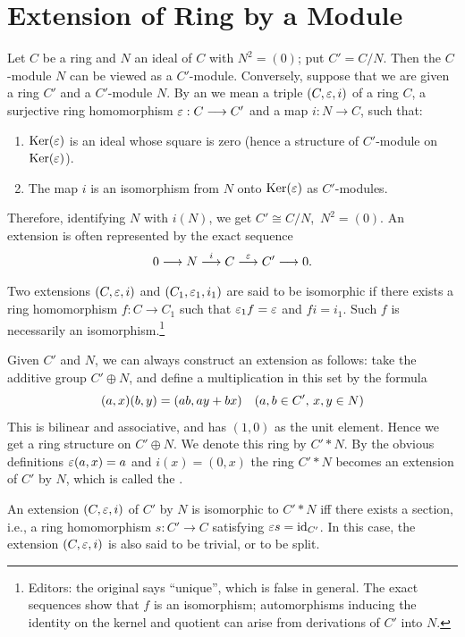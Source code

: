 \documentclass[../main]{subfiles}
\begin{document}
\section{Extension of Ring by a Module}\label{sec:25}

\newparagraph
Let $C$ be a ring and $N$ an ideal of $C$ with $N^2=(0)$; put $C'=C/N$. Then the $C$-module $N$ can be viewed as a $C'$-module. Conversely, suppose that we are given a ring $C'$ and a $C'$-module $N$. By an  we mean a triple $(C,\varepsilon,i)$ of a ring $C$, a surjective ring homomorphism $\varepsilon:C\longrightarrow C'$ and a map $i:N\longrightarrow C$, such that:
\begin{enumerate}
    \item $\operatorname{Ker}(\varepsilon)$ is an ideal whose square is zero (hence a structure of $C'$-module on $\operatorname{Ker}(\varepsilon)$).
    \item The map $i$ is an isomorphism from $N$ onto $\operatorname{Ker}(\varepsilon)$ as $C'$-modules.
\end{enumerate}
Therefore, identifying $N$ with $i(N)$, we get $C'\cong C/N$, $\, N^2=(0)$. An extension is often represented by the exact sequence \[0\longrightarrow N\varrightarrow iC\varrightarrow\ep C'\longrightarrow0.\] Two extensions $(C,\varepsilon,i)$ and $(C_1,\varepsilon_1,i_1)$ are said to be isomorphic if there exists a ring homomorphism $f:C\longrightarrow C_1$ such that $\varepsilon_1f=\varepsilon$ and $fi=i_1$. Such $f$ is necessarily an isomorphism.\footnote{Editors: the original says ``unique'', which is false in general. The exact sequences show that $f$ is an isomorphism; automorphisms inducing the identity on the kernel and quotient can arise from derivations of $C'$ into $N$.}

\newparagraph
Given $C'$ and $N$, we can always construct an extension as follows: take the additive group $C'\oplus N$, and define a multiplication in this set by the formula
\[(a,x)(b,y) = (ab,ay+bx)
\for{a,b\in C',\,x,y\in N}\]
This is bilinear and associative, and has $(1,0)$ as the unit element. Hence we get a ring structure on $C'\oplus N$. We denote this ring by $C'* N$. By the obvious definitions $\varepsilon(a,x) = a$ and $i(x) = (0,x)$ the ring $C'*N$ becomes an extension of $C'$ by $N$, which is called the .

An extension $(C,\varepsilon,i)$ of $C'$ by $N$ is isomorphic to $C'*N$ iff there exists a section, i.e., a ring homomorphism $s:C'\longrightarrow C$ satisfying $\varepsilon s=\operatorname{id}_{C'}$. In this case, the extension $(C,\varepsilon,i)$ is also said to be trivial, or to be split.
\end{document}
